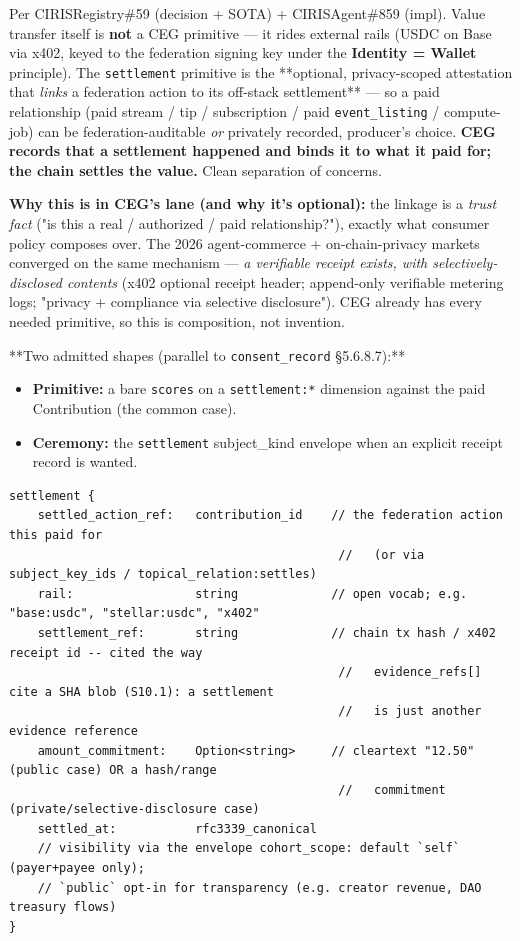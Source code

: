 \documentclass[10pt]{article}
\begin{document}
Per CIRISRegistry\#59 (decision + SOTA) + CIRISAgent\#859 (impl). Value transfer itself is \textbf{not} a CEG primitive — it rides external rails (USDC on Base via x402, keyed to the federation signing key under the \textbf{Identity = Wallet} principle). The \texttt{settlement} primitive is the **optional, privacy-scoped attestation that \textit{links} a federation action to its off-stack settlement** — so a paid relationship (paid stream / tip / subscription / paid \texttt{event\_listing} / compute-job) can be federation-auditable \textit{or} privately recorded, producer's choice. \textbf{CEG records that a settlement happened and binds it to what it paid for; the chain settles the value.} Clean separation of concerns.


\textbf{Why this is in CEG's lane (and why it's optional):} the linkage is a \textit{trust fact} ("is this a real / authorized / paid relationship?"), exactly what consumer policy composes over. The 2026 agent-commerce + on-chain-privacy markets converged on the same mechanism — \textit{a verifiable receipt exists, with selectively-disclosed contents} (x402 optional receipt header; append-only verifiable metering logs; "privacy + compliance via selective disclosure"). CEG already has every needed primitive, so this is composition, not invention.


**Two admitted shapes (parallel to \texttt{consent\_record} §5.6.8.7):**

\begin{itemize}\setlength\itemsep{0pt}
\item \textbf{Primitive:} a bare \texttt{scores} on a \texttt{settlement:*} dimension against the paid Contribution (the common case).
\item \textbf{Ceremony:} the \texttt{settlement} subject\_kind envelope when an explicit receipt record is wanted.
\end{itemize}


\begin{lstlisting}
settlement {
    settled_action_ref:   contribution_id    // the federation action this paid for
                                              //   (or via subject_key_ids / topical_relation:settles)
    rail:                 string             // open vocab; e.g. "base:usdc", "stellar:usdc", "x402"
    settlement_ref:       string             // chain tx hash / x402 receipt id -- cited the way
                                              //   evidence_refs[] cite a SHA blob (S10.1): a settlement
                                              //   is just another evidence reference
    amount_commitment:    Option<string>     // cleartext "12.50" (public case) OR a hash/range
                                              //   commitment (private/selective-disclosure case)
    settled_at:           rfc3339_canonical
    // visibility via the envelope cohort_scope: default `self` (payer+payee only);
    // `public` opt-in for transparency (e.g. creator revenue, DAO treasury flows)
}
\end{lstlisting}
\end{document}

